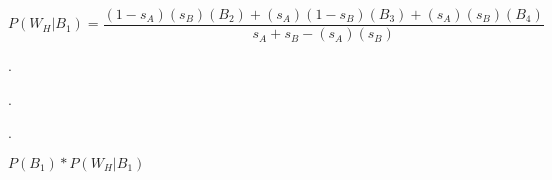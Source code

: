 \documentclass[11pt]{article}
\begin{document}
\begin{equation*}
    P(W_{H} | B_1) = \frac{(1-s_{A})(s_{B})(B_{2}) + (s_{A})(1-s_{B})(B_{3})+(s_{A})(s_{B})(B_{4})}{s_{A} + s_{B} - (s_{A})(s_{B})}
\end{equation*}

.

.

.

\( P(B_{1}) * P(W_{H} | B_{1})
\)
\end{document}
